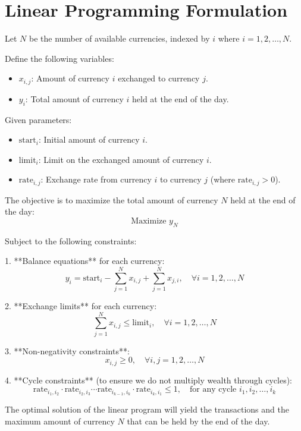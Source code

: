 \documentclass{article}
\begin{document}
\section*{Linear Programming Formulation}

Let \( N \) be the number of available currencies, indexed by \( i \) where \( i = 1, 2, \ldots, N \). 

Define the following variables:
\begin{itemize}
    \item \( x_{i,j} \): Amount of currency \( i \) exchanged to currency \( j \).
    \item \( y_i \): Total amount of currency \( i \) held at the end of the day.
\end{itemize}

Given parameters:
\begin{itemize}
    \item \( \text{start}_i \): Initial amount of currency \( i \).
    \item \( \text{limit}_i \): Limit on the exchanged amount of currency \( i \).
    \item \( \text{rate}_{i,j} \): Exchange rate from currency \( i \) to currency \( j \) (where \( \text{rate}_{i,j} > 0 \)).
\end{itemize}

The objective is to maximize the total amount of currency \( N \) held at the end of the day:
\[
\text{Maximize } y_N
\]

Subject to the following constraints:

1. **Balance equations** for each currency:
\[
y_i = \text{start}_i - \sum_{j=1}^{N} x_{i,j} + \sum_{j=1}^{N} x_{j,i}, \quad \forall i = 1, 2, \ldots, N
\]

2. **Exchange limits** for each currency:
\[
\sum_{j=1}^{N} x_{i,j} \leq \text{limit}_i, \quad \forall i = 1, 2, \ldots, N
\]

3. **Non-negativity constraints**:
\[
x_{i,j} \geq 0, \quad \forall i, j = 1, 2, \ldots, N
\]

4. **Cycle constraints** (to ensure we do not multiply wealth through cycles):
\[
\text{rate}_{i_1,i_2} \cdot \text{rate}_{i_2,i_3} \cdots \text{rate}_{i_{k-1},i_k} \cdot \text{rate}_{i_k,i_1} \leq 1, \quad \text{for any cycle } i_1, i_2, \ldots, i_k
\]

The optimal solution of the linear program will yield the transactions and the maximum amount of currency \( N \) that can be held by the end of the day.
\end{document}

